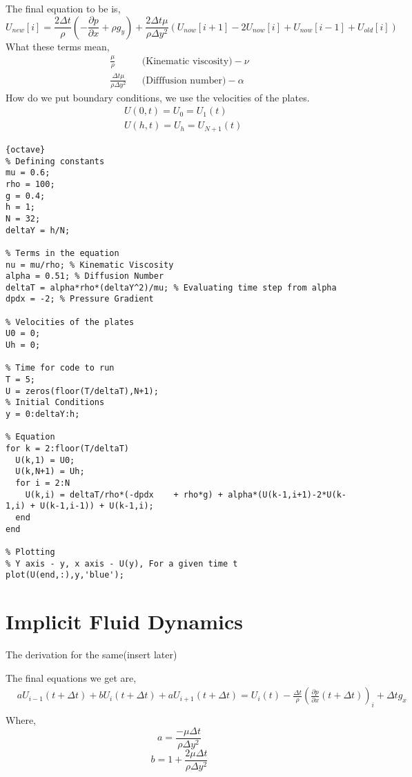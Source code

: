\documentclass{report}
\begin{document}
\begin{enumerate}
  The final equation to be is,
  \[
    U_{new}[i] = \frac{2 \Delta t}{\rho}(-\frac{\partial p}{\partial x} + \rho g_y) + \frac{2 \Delta t \mu}{\rho \Delta y^2}(U_{now}[i+1] - 2U_{now}[i] + U_{now}[i-1] + U_{old}[i])
  \]
  What these terms mean,
  \begin{align*}
    \frac{\mu}{\rho} & & \text{(Kinematic viscosity)}-\nu \\
    \frac{\Delta t\mu}{\rho \Delta y^2} & & \text{(Difffusion number)}-\alpha
  \end{align*}
  How do we put boundary conditions, we use the velocities of the plates.
  \begin{align*}
   &U(0,t) = U_0 = U_1(t)  \\
   &U(h,t) = U_h = U_{N+1}(t)
  \end{align*}
\begin{lstlisting}{octave}
% Defining constants
mu = 0.6;
rho = 100;
g = 0.4;
h = 1;
N = 32;
deltaY = h/N;

% Terms in the equation
nu = mu/rho; % Kinematic Viscosity
alpha = 0.51; % Diffusion Number
deltaT = alpha*rho*(deltaY^2)/mu; % Evaluating time step from alpha
dpdx = -2; % Pressure Gradient

% Velocities of the plates
U0 = 0;
Uh = 0;

% Time for code to run
T = 5;
U = zeros(floor(T/deltaT),N+1);
% Initial Conditions
y = 0:deltaY:h;

% Equation
for k = 2:floor(T/deltaT)
  U(k,1) = U0;
  U(k,N+1) = Uh;
  for i = 2:N
    U(k,i) = deltaT/rho*(-dpdx    + rho*g) + alpha*(U(k-1,i+1)-2*U(k-1,i) + U(k-1,i-1)) + U(k-1,i);
  end
end

% Plotting
% Y axis - y, x axis - U(y), For a given time t
plot(U(end,:),y,'blue');
\end{lstlisting}
\section{Implicit Fluid Dynamics}
The derivation for the same(insert later)

The final equations we get are,
\begin{align*}
	&a U _{i-1}(t + \Delta t) + b U_i(t+ \Delta t) + a U_{i+1}(t + \Delta t) = U_{i}(t) - \frac{\Delta t}{\rho}(\frac{\partial p}{\partial x}(t + \Delta t))_i + \Delta t g_x \\
\end{align*}
Where, 
\[ 
	a = \frac{-\mu \Delta t}{\rho \Delta y^2}
\]
\[
	b = 1 + \frac{2\mu \Delta t}{\rho \Delta y^2}
\]


\end{enumerate}
\end{document}

